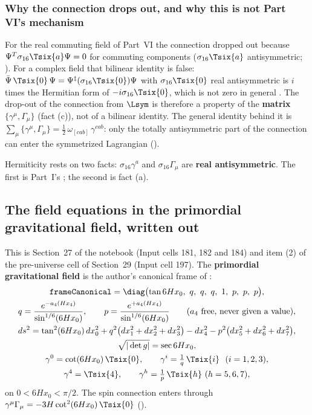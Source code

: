 \subsubsection{Why the connection drops out, and why this is not Part VI's mechanism}
\label{sec:3.3.3}

For the real commuting field of Part~VI the connection dropped out because
$\Psi^{T}\sigma_{16}\Tsix{a}\Psi=0$ for commuting components ($\sigma_{16}\Tsix{a}$ antisymmetric;
). For a complex field that bilinear identity is false:
$\bar\Psi\,\Tsix{0}\,\Psi=\Psi^{\ddagger}(\sigma_{16}\Tsix{0})\Psi$ with $\sigma_{16}\Tsix{0}$ real
antisymmetric is $i$ times the Hermitian form of $-i\sigma_{16}\Tsix{0}$, which is not zero in
general \cfderived. The drop-out of the connection from $\Lsym$ is therefore a property of the
\textbf{matrix} $\{\gamma^\mu,\Gamma_\mu\}$ (fact (c)), not of a bilinear identity. The general
identity behind it is $\sum_\mu\{\gamma^\mu,\Gamma_\mu\}=\tfrac12\,\omega_{[cab]}\,\gamma^{cab}$:
only the totally antisymmetric part of the connection can enter the symmetrized Lagrangian
().

Hermiticity rests on two facts: $\sigma_{16}\gamma^a$ and $\sigma_{16}\Gamma_\mu$ are \textbf{real
antisymmetric}. The first is Part~I's ; the second is
fact (a).

\subsection{The field equations in the primordial gravitational field, written out}
\label{sec:3.4}

This is Section~27 of the notebook (Input cells 181, 182 and 184) and item (2) of the pre-universe
cell of Section~29 (Input cell 197). The \textbf{primordial gravitational field} is the author's
canonical frame of :
\begin{gather*}
  \texttt{frameCanonical}=\diag\bigl(\tan 6Hx_0,\ q,\ q,\ q,\ 1,\ p,\ p,\ p\bigr),\\
  q=\frac{e^{-a_4(Hx_4)}}{\sin^{1/6}(6Hx_0)},\qquad p=\frac{e^{+a_4(Hx_4)}}{\sin^{1/6}(6Hx_0)}\qquad(a_4\text{ free, never given a value}),\\
  ds^2=\tan^2(6Hx_0)\,dx_0^2+q^2\bigl(dx_1^2+dx_2^2+dx_3^2\bigr)-dx_4^2-p^2\bigl(dx_5^2+dx_6^2+dx_7^2\bigr),\\
  \sqrt{|\det g|}=\sec 6Hx_0,\\
  \gamma^0=\cot(6Hx_0)\,\Tsix{0},\qquad \gamma^i=\tfrac1q\,\Tsix{i}\ \ (i=1,2,3),\\
  \gamma^4=\Tsix{4},\qquad \gamma^h=\tfrac1p\,\Tsix{h}\ (h=5,6,7),
\end{gather*}
on $0<6Hx_0<\pi/2$. The spin connection enters through
$\gamma^\mu\Gamma_\mu=-3H\cot^2(6Hx_0)\,\Tsix{0}$ ().

